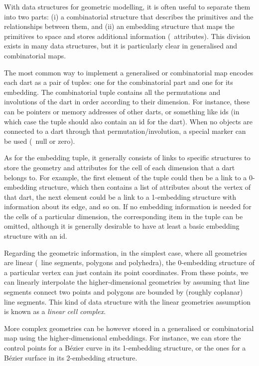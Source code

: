 With data structures for geometric modelling, it is often useful to separate them into two parts: (i) a combinatorial structure that describes the primitives and the relationships between them, and (ii) an embedding structure that maps the primitives to space and stores additional information (\eg\ attributes).
This division exists in many data structures, but it is particularly clear in generalised and combinatorial maps.

The most common way to implement a generalised or combinatorial map encodes each dart as a pair of tuples: one for the combinatorial part and one for its embedding.
The combinatorial tuple contains all the permutations and involutions of the dart in order according to their dimension.
For instance, these can be pointers or memory addresses of other darts, or something like ids (in which case the tuple should also contain an id for the dart).
When no objects are connected to a dart through that permutation/involution, a special marker can be used (\eg\ null or zero).

As for the embedding tuple, it generally consists of links to specific structures to store the geometry and attributes for the cell of each dimension that a dart belongs to.
For example, the first element of the tuple could then be a link to a 0-embedding structure, which then contains a list of attributes about the vertex of that dart, the next element could be a link to a 1-embedding structure with information about its edge, and so on.
If no embedding information is needed for the cells of a particular dimension, the corresponding item in the tuple can be omitted, although it is generally desirable to have at least a basic embedding structure with an id.

Regarding the geometric information, in the simplest case, where all geometries are linear (\ie\ line segments, polygons and polyhedra), the 0-embedding structure of a particular vertex can just contain its point coordinates.
From these points, we can linearly interpolate the higher-dimensional geometries by assuming that line segments connect two points and polygons are bounded by (roughly coplanar) line segments.
This kind of data structure with the linear geometries assumption is known as a \emph{linear cell complex}.

More complex geometries can be however stored in a generalised or combinatorial map using the higher-dimensional embeddings.
For instance, we can store the control points for a B\'ezier curve in its 1-embedding structure, or the ones for a B\'ezier surface in its 2-embedding structure.


